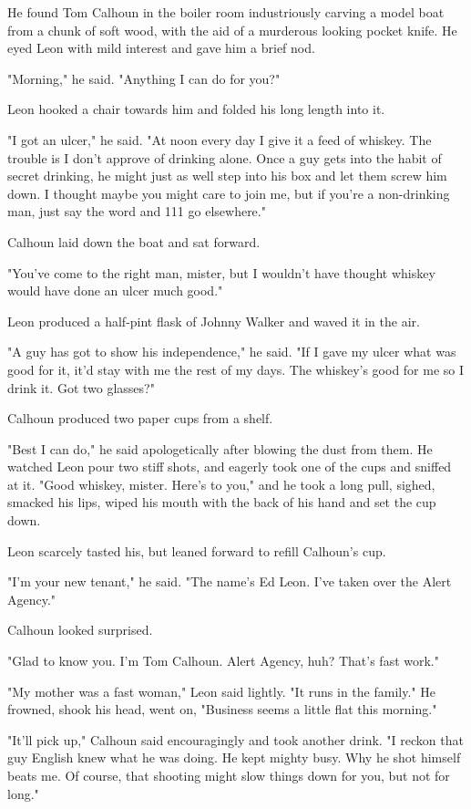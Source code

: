 \documentclass{novel}
\begin{document}
He found Tom Calhoun in the boiler room industriously carving a model boat from a chunk of soft wood, with the aid of a murderous looking pocket knife. He eyed Leon with mild interest and gave him a brief nod.

"Morning," he said. "Anything I can do for you?"

Leon hooked a chair towards him and folded his long length into it.

"I got an ulcer," he said. "At noon every day I give it a feed of whiskey. The trouble is I don't approve of drinking alone. Once a guy gets into the habit of secret drinking, he might just as well step into his box and let them screw him down. I thought maybe you might care to join me, but if you're a non-drinking man, just say the word and 111 go elsewhere."

Calhoun laid down the boat and sat forward.

"You've come to the right man, mister, but I wouldn't have thought whiskey would have done an ulcer much good."

Leon produced a half-pint flask of Johnny Walker and waved it in the air.

"A guy has got to show his independence," he said. "If I gave my ulcer what was good for it, it'd stay with me the rest of my days. The whiskey's good for me so I drink it. Got two glasses?"

Calhoun produced two paper cups from a shelf.

"Best I can do," he said apologetically after blowing the dust from them. He watched Leon pour two stiff shots, and eagerly took one of the cups and sniffed at it. "Good whiskey, mister. Here's to you," and he took a long pull, sighed, smacked his lips, wiped his mouth with the back of his hand and set the cup down.

Leon scarcely tasted his, but leaned forward to refill Calhoun's cup.

"I'm your new tenant," he said. "The name's Ed Leon. I've taken over the Alert Agency."

Calhoun looked surprised.

"Glad to know you. I'm Tom Calhoun. Alert Agency, huh? That's fast work."

"My mother was a fast woman," Leon said lightly. "It runs in the family." He frowned, shook his head, went on, "Business seems a little flat this morning."

"It'll pick up," Calhoun said encouragingly and took another drink. "I reckon that guy English knew what he was doing. He kept mighty busy. Why he shot himself beats me. Of course, that shooting might slow things down for you, but not for long."
\end{document}
